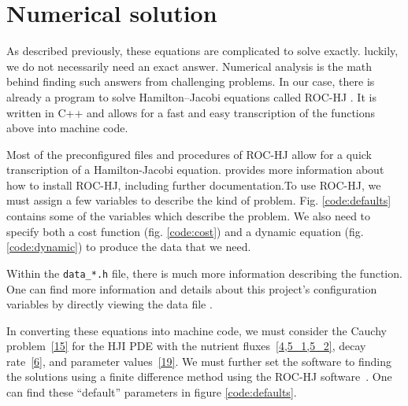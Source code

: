 \documentclass[11pt]{amsart}
\begin{document}
\section{Numerical solution}
As described previously, these equations are complicated to solve exactly. luckily, we do not necessarily need an exact answer. Numerical analysis is the math behind finding such answers from challenging problems. In our case, there is already a program to solve Hamilton--Jacobi equations called ROC-HJ \cite{ROCHJ2019}. It is written in C++ and allows for a fast and easy
transcription of the functions above into machine code. 

Most of the preconfigured files and procedures of ROC-HJ allow for a quick transcription
of a Hamilton-Jacobi equation. \cite{ROCHJ2019} provides more information about how to install ROC-HJ, including further documentation.To use ROC-HJ, we must assign a few variables to describe the kind
of problem. Fig. \ref{code:defaults} contains some of the variables which
describe the problem. We also need to specify both a cost function (fig. \ref{code:cost}) and a dynamic equation (fig. \ref{code:dynamic}) to produce the data that we need.


Within the \texttt{data\_*.h} file, there is much more information describing
the function. One can find more information and details about this project's
configuration variables by directly viewing the data file \cite{data_ivan.h}.

In converting these equations into machine code, we must consider the Cauchy problem~\cref{15} for the HJI PDE with the nutrient
fluxes~\cref{4,5_1,5_2}, decay rate~\cref{6}, and parameter values~\cref{19}. We must further set the software to finding the solutions using a finite difference method 
\cite{FlemingSoner2006,
      OsherShu1991,
      BotkinHoffmannTurova2011,
      BokanForcadelZidani2010}
using the ROC-HJ software~\cite{ROCHJ2019}. One can find these ``default'' parameters in figure \ref{code:defaults}.
\end{document}
